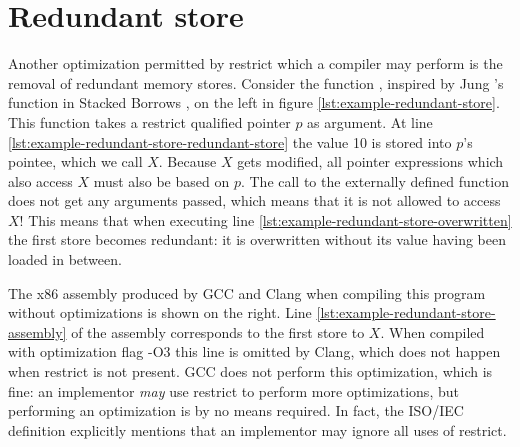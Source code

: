 \section{Redundant store}\label{section:example-redundant-store}
Another optimization permitted by restrict which a compiler may perform is the removal of redundant memory stores.
Consider the function , inspired by Jung \etall's  function
in Stacked Borrows \cite{jung2019stacked}, on the left in figure \ref{lst:example-redundant-store}.
This function takes a restrict qualified pointer $p$ as argument.
At line \ref{lst:example-redundant-store-redundant-store} the value 10 is stored into
$p$'s pointee, which we call $X$.
Because $X$ gets modified, all pointer expressions which also access $X$ must also 
be based on $p$.
The call to the externally defined function  does not get any arguments passed,
which means that it is not allowed to access $X$!
This means that when executing line \ref{lst:example-redundant-store-overwritten} the first store
becomes redundant: it is overwritten without its value having been loaded in between.

The x86 assembly produced by GCC and Clang when compiling this program without optimizations is shown on 
the right.
Line \ref{lst:example-redundant-store-assembly} of the assembly corresponds to the first store to $X$.
When compiled with optimization flag -O3 this line is omitted by Clang, which does not happen when restrict is 
not present.
GCC does not perform this optimization, which is fine: an implementor \textit{may} use restrict to perform
more optimizations, but performing an optimization is by no means required.
In fact, the ISO/IEC definition explicitly mentions that an implementor may ignore all uses of restrict.


